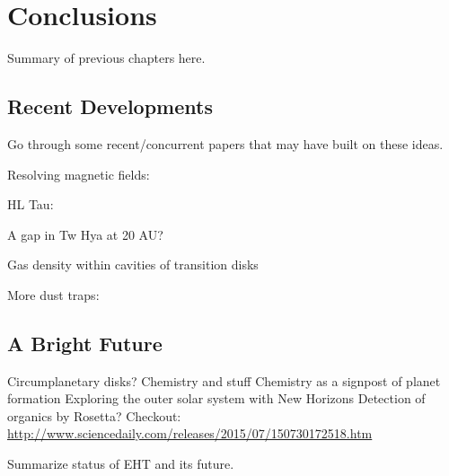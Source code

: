 \chapter{Conclusions} \label{chapter:conclusion}

Summary of previous chapters here.

\section{Recent Developments}

Go through some recent/concurrent papers that may have built on these ideas.

Resolving magnetic fields: \citep{stephens14}

HL Tau: \citep{brogan14}

A gap in Tw Hya at 20 AU? \citep{akiyama15}

Gas density within cavities of transition disks \citep{vandermarel15}

More dust traps: \citep{espaillat15}

\section{A Bright Future}
Circumplanetary disks? \citep{perez15}
Chemistry and stuff \citep{oberg15} \citep{graninger15} 
Chemistry as a signpost of planet formation \citep{cleeves15}
Exploring the outer solar system with New Horizons
Detection of organics by Rosetta? Checkout: \url{http://www.sciencedaily.com/releases/2015/07/150730172518.htm}

Summarize status of EHT and its future.


